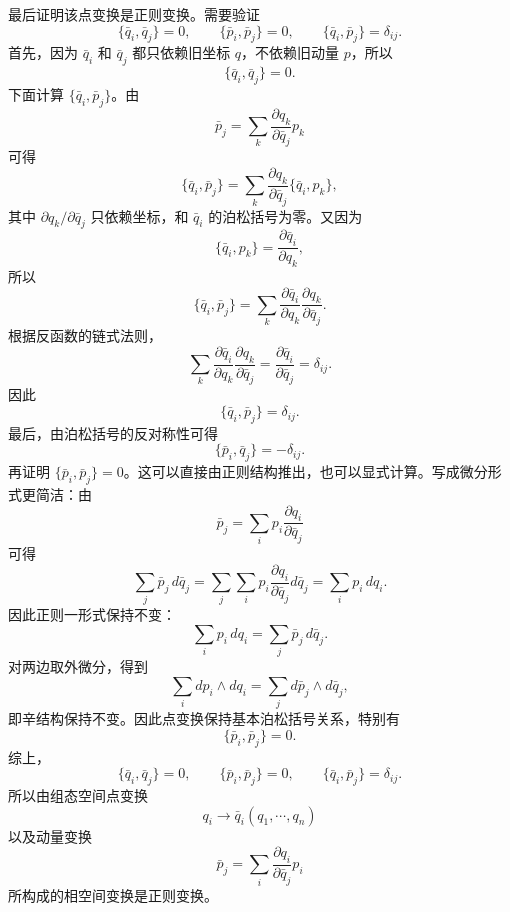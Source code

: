 \begin{solution}[正则变换中的动量变换]
最后证明该点变换是正则变换。需要验证
\[
\{\bar q_i,\bar q_j\}=0,\qquad
\{\bar p_i,\bar p_j\}=0,\qquad
\{\bar q_i,\bar p_j\}=\delta_{ij}.
\]
首先，因为 \(\bar q_i\) 和 \(\bar q_j\) 都只依赖旧坐标 \(q\)，不依赖旧动量 \(p\)，所以
\[
\{\bar q_i,\bar q_j\}=0.
\]
下面计算 \(\{\bar q_i,\bar p_j\}\)。由
\[
\bar p_j=\sum_k\frac{\partial q_k}{\partial \bar q_j}p_k
\]
可得
\[
\{\bar q_i,\bar p_j\}
=
\sum_k
\frac{\partial q_k}{\partial \bar q_j}
\{\bar q_i,p_k\},
\]
其中 \(\partial q_k/\partial \bar q_j\) 只依赖坐标，和 \(\bar q_i\) 的泊松括号为零。又因为
\[
\{\bar q_i,p_k\}
=
\frac{\partial \bar q_i}{\partial q_k},
\]
所以
\[
\{\bar q_i,\bar p_j\}
=
\sum_k
\frac{\partial \bar q_i}{\partial q_k}
\frac{\partial q_k}{\partial \bar q_j}.
\]
根据反函数的链式法则，
\[
\sum_k
\frac{\partial \bar q_i}{\partial q_k}
\frac{\partial q_k}{\partial \bar q_j}
=
\frac{\partial \bar q_i}{\partial \bar q_j}
=
\delta_{ij}.
\]
因此
\[
\{\bar q_i,\bar p_j\}=\delta_{ij}.
\]
最后，由泊松括号的反对称性可得
\[
\{\bar p_i,\bar q_j\}=-\delta_{ij}.
\]
再证明 \(\{\bar p_i,\bar p_j\}=0\)。这可以直接由正则结构推出，也可以显式计算。写成微分形式更简洁：由
\[
\bar p_j=\sum_i p_i\frac{\partial q_i}{\partial \bar q_j}
\]
可得
\[
\sum_j\bar p_j\,d\bar q_j
=
\sum_j\sum_i p_i\frac{\partial q_i}{\partial \bar q_j}d\bar q_j
=
\sum_i p_i\,dq_i.
\]
因此正则一形式保持不变：
\[
\sum_i p_i\,dq_i=\sum_j\bar p_j\,d\bar q_j.
\]
对两边取外微分，得到
\[
\sum_i dp_i\wedge dq_i
=
\sum_j d\bar p_j\wedge d\bar q_j,
\]
即辛结构保持不变。因此点变换保持基本泊松括号关系，特别有
\[
\{\bar p_i,\bar p_j\}=0.
\]
综上，
\[
\{\bar q_i,\bar q_j\}=0,\qquad
\{\bar p_i,\bar p_j\}=0,\qquad
\{\bar q_i,\bar p_j\}=\delta_{ij}.
\]
所以由组态空间点变换
\[
q_i\to \bar q_i(q_1,\cdots,q_n)
\]
以及动量变换
\[
\bar p_j=\sum_i\frac{\partial q_i}{\partial \bar q_j}p_i
\]
所构成的相空间变换是正则变换。
\end{solution}


